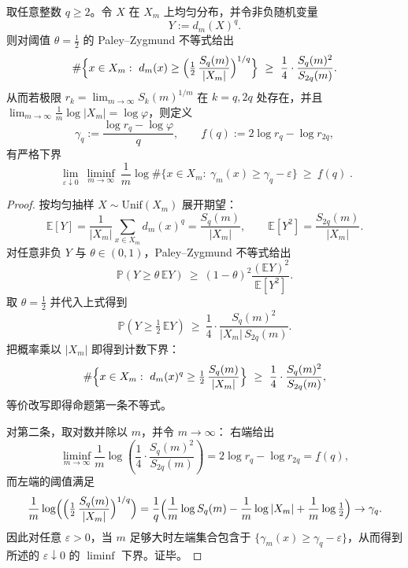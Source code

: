 \begin{proposition}\label{prop:pom-spectrum-pz-lower}
取任意整数 \(q\ge 2\)。令 \(X\) 在 \(X_m\) 上均匀分布，并令非负随机变量
\[
Y:=d_m(X)^q.
\]
则对阈值 \(\theta=\tfrac12\) 的 Paley--Zygmund 不等式给出
\[
\#\Bigl\{x\in X_m:\ d_m(x)\ge \Bigl(\tfrac12\,\frac{S_q(m)}{|X_m|}\Bigr)^{1/q}\Bigr\}
\ \ge\ \frac14\cdot\frac{S_q(m)^2}{S_{2q}(m)}.
\]
从而若极限 \(r_k=\lim_{m\to\infty}S_k(m)^{1/m}\) 在 \(k=q,2q\) 处存在，并且 \(\lim_{m\to\infty}\frac1m\log|X_m|=\log\varphi\)，则定义
\[
\gamma_q:=\frac{\log r_q-\log\varphi}{q},
\qquad
\underline f(q):=2\log r_q-\log r_{2q},
\]
有严格下界
\[
\boxed{\;
\lim_{\varepsilon\downarrow 0}\ \liminf_{m\to\infty}\ \frac1m
\log \#\bigl\{x\in X_m:\ \gamma_m(x)\ge \gamma_q-\varepsilon\bigr\}
\ \ge\ \underline f(q)\; }.
\]
\end{proposition}
\begin{proof}
按均匀抽样 \(X\sim \mathrm{Unif}(X_m)\) 展开期望：
\[
\mathbb{E}[Y]=\frac{1}{|X_m|}\sum_{x\in X_m}d_m(x)^q=\frac{S_q(m)}{|X_m|},
\qquad
\mathbb{E}[Y^2]=\frac{S_{2q}(m)}{|X_m|}.
\]
对任意非负 \(Y\) 与 \(\theta\in(0,1)\)，Paley--Zygmund 不等式给出
\[
\mathbb{P}\!\left(Y\ge \theta\,\mathbb{E}Y\right)\ \ge\ (1-\theta)^2\frac{(\mathbb{E}Y)^2}{\mathbb{E}[Y^2]}.
\]
取 \(\theta=\tfrac12\) 并代入上式得到
\[
\mathbb{P}\!\left(Y\ge \tfrac12\,\mathbb{E}Y\right)\ \ge\ \frac14\cdot\frac{S_q(m)^2}{|X_m|\,S_{2q}(m)}.
\]
把概率乘以 \(|X_m|\) 即得到计数下界：
\[
\#\Bigl\{x\in X_m:\ d_m(x)^q\ge \tfrac12\,\frac{S_q(m)}{|X_m|}\Bigr\}
\ \ge\ \frac14\cdot\frac{S_q(m)^2}{S_{2q}(m)},
\]
等价改写即得命题第一条不等式。
\par
对第二条，取对数并除以 \(m\)，并令 \(m\to\infty\)：
右端给出
\[
\liminf_{m\to\infty}\frac1m\log\!\left(\frac14\cdot\frac{S_q(m)^2}{S_{2q}(m)}\right)
=2\log r_q-\log r_{2q}=\underline f(q),
\]
而左端的阈值满足
\[
\frac1m\log\Bigl(\Bigl(\tfrac12\,\frac{S_q(m)}{|X_m|}\Bigr)^{1/q}\Bigr)
=\frac{1}{q}\Bigl(\frac1m\log S_q(m)-\frac1m\log|X_m|+\frac1m\log\tfrac12\Bigr)
\to \gamma_q.
\]
因此对任意 \(\varepsilon>0\)，当 \(m\) 足够大时左端集合包含于 \(\{\gamma_m(x)\ge \gamma_q-\varepsilon\}\)，从而得到所述的 \(\varepsilon\downarrow 0\) 的 \(\liminf\) 下界。证毕。
\end{proof}

